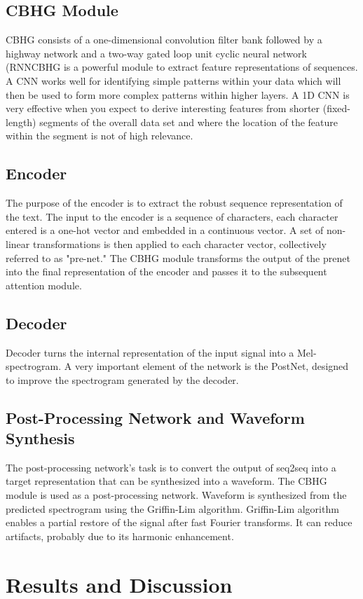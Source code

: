 \documentclass[journal,transmag]{JIISTjrnl}
\begin{document}
\subsection {CBHG Module}
CBHG consists of a one-dimensional convolution filter bank followed by a highway network and a two-way gated loop unit cyclic neural network (RNNCBHG is a powerful module to extract feature representations of sequences. A CNN works well for identifying simple patterns within your data which will then be used to form more complex patterns within higher layers. A 1D CNN is very effective when you expect to derive interesting features from shorter (fixed-length) segments of the overall data set and where the location of the feature within the segment is not of high relevance.
\subsection{Encoder}
The purpose of the encoder is to extract the robust sequence representation of the text. The input to the encoder is a sequence of characters, each character entered is a one-hot vector and embedded in a continuous vector. A set of non-linear transformations is then applied to each character vector, collectively referred to as "pre-net." The CBHG module transforms the output of the prenet into the final representation of the encoder and passes it to the subsequent attention module.
\subsection{Decoder}
Decoder turns the internal representation of the input signal into a Mel-spectrogram. A very important element of the network is the PostNet, designed to improve the spectrogram generated by the decoder.
\subsection{Post-Processing Network and Waveform Synthesis}
The post-processing network's task is to convert the output of seq2seq into a target representation that can be synthesized into a waveform. The CBHG module is used as a post-processing network. Waveform is synthesized from the predicted spectrogram using the Griffin-Lim algorithm. Griffin-Lim algorithm enables a partial restore of the signal after fast Fourier transforms. It can reduce artifacts, probably due to its harmonic enhancement. 
\section{Results and Discussion}
\end{document}
